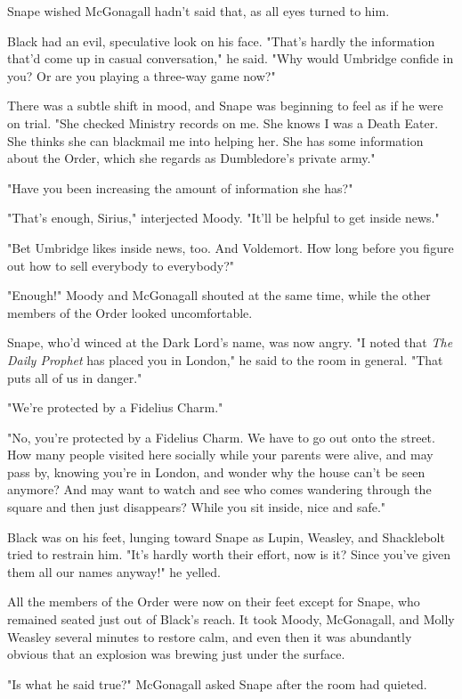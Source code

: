 \documentclass[a4paper,11pt]{article}
\begin{document}
Snape wished McGonagall hadn't said that, as all eyes turned to him.

Black had an evil, speculative look on his face. "That's hardly the information that'd come up in casual conversation," he said. "Why would Umbridge confide in you? Or are you playing a three-way game now?"

There was a subtle shift in mood, and Snape was beginning to feel as if he were on trial. "She checked Ministry records on me. She knows I was a Death Eater. She thinks she can blackmail me into helping her. She has some information about the Order, which she regards as Dumbledore's private army."

"Have you been increasing the amount of information she has?"

"That's enough, Sirius," interjected Moody. "It'll be helpful to get inside news."

"Bet Umbridge likes inside news, too. And Voldemort. How long before you figure out how to sell everybody to everybody?"

"Enough!" Moody and McGonagall shouted at the same time, while the other members of the Order looked uncomfortable.

Snape, who'd winced at the Dark Lord's name, was now angry. "I noted that \emph{The Daily Prophet} has placed you in London," he said to the room in general. "That puts all of us in danger."

"We're protected by a Fidelius Charm."

"No, you're protected by a Fidelius Charm. We have to go out onto the street. How many people visited here socially while your parents were alive, and may pass by, knowing you're in London, and wonder why the house can't be seen anymore? And may want to watch and see who comes wandering through the square and then just disappears? While you sit inside, nice and safe."

Black was on his feet, lunging toward Snape as Lupin, Weasley, and Shacklebolt tried to restrain him. "It's hardly worth their effort, now is it? Since you've given them all our names anyway!" he yelled.

All the members of the Order were now on their feet except for Snape, who remained seated just out of Black's reach. It took Moody, McGonagall, and Molly Weasley several minutes to restore calm, and even then it was abundantly obvious that an explosion was brewing just under the surface.

"Is what he said true?" McGonagall asked Snape after the room had quieted.
\end{document}
